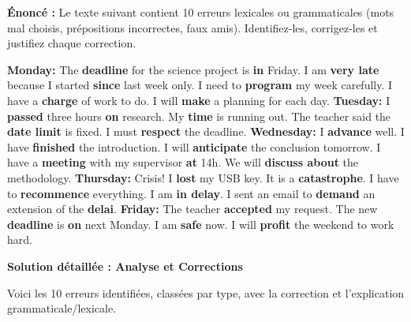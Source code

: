 \documentclass[11pt]{article}
\begin{document}
\begin{exoresolu}
\textbf{Énoncé :} Le texte suivant contient 10 erreurs lexicales ou grammaticales (mots mal choisis, prépositions incorrectes, faux amis). Identifiez-les, corrigez-les et justifiez chaque correction.

\begin{textebox}
\textbf{Monday:} The \textbf{deadline} for the science project is \textbf{in} Friday. I am \textbf{very late} because I started \textbf{since} last week only. I need to \textbf{program} my week carefully. I have a \textbf{charge} of work to do. I will \textbf{make} a planning for each day.
\textbf{Tuesday:} I \textbf{passed} three hours \textbf{on} research. My \textbf{time} is running out. The teacher said the \textbf{date limit} is fixed. I must \textbf{respect} the deadline.
\textbf{Wednesday:} I \textbf{advance} well. I have \textbf{finished} the introduction. I will \textbf{anticipate} the conclusion tomorrow. I have a \textbf{meeting} with my supervisor \textbf{at} 14h. We will \textbf{discuss about} the methodology.
\textbf{Thursday:} Crisis! I \textbf{lost} my USB key. It is a \textbf{catastrophe}. I have to \textbf{recommence} everything. I am \textbf{in delay}. I sent an email to \textbf{demand} an extension of the \textbf{delai}.
\textbf{Friday:} The teacher \textbf{accepted} my request. The new \textbf{deadline} is \textbf{on} next Monday. I am \textbf{safe} now. I will \textbf{profit} the weekend to work hard.
\end{textebox}

\tcblower

\textbf{Solution détaillée : Analyse et Corrections}

Voici les 10 erreurs identifiées, classées par type, avec la correction et l'explication grammaticale/lexicale.


\end{exoresolu}
\end{document}
